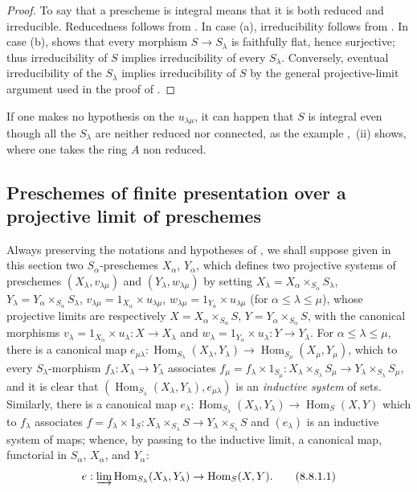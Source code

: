 \begin{proof}
To say that a prescheme is integral means that it is both reduced and irreducible. Reducedness follows from . In case (a), irreducibility follows from . In case (b),  shows that every morphism $S\to S_\lambda$ is faithfully flat, hence surjective; thus irreducibility of $S$ implies irreducibility of every $S_\lambda$. Conversely, eventual irreducibility of the $S_\lambda$ implies irreducibility of $S$ by the general projective-limit argument used in the proof of .
\end{proof}

\begin{remark}[8.7.4]
\label{IV.8.7.4}
If one makes no hypothesis on the $u_{\lambda\mu}$, it can happen that $S$ is integral even though all the $S_\lambda$ are neither reduced nor connected, as the example ,~(ii) shows, where one takes the ring $A$ non reduced.
\end{remark}

\subsection{Preschemes of finite presentation over a projective limit of preschemes}
\label{subsection:IV.8.8}

\begin{env}[8.8.1]
\label{IV.8.8.1}
Always preserving the notations and hypotheses of , we shall suppose given in this section two $S_\alpha$-preschemes $X_\alpha$, $Y_\alpha$, which defines  two projective systems of preschemes $(X_\lambda,v_{\lambda\mu})$ and $(Y_\lambda,w_{\lambda\mu})$ by setting $X_\lambda=X_\alpha\times_{S_\alpha}S_\lambda$, $Y_\lambda=Y_\alpha\times_{S_\alpha}S_\lambda$, $v_{\lambda\mu}=1_{X_\alpha}\times u_{\lambda\mu}$, $w_{\lambda\mu}=1_{Y_\alpha}\times u_{\lambda\mu}$ (for $\alpha\leqslant\lambda\leqslant\mu$), whose projective limits are respectively $X=X_\alpha\times_{S_\alpha}S$, $Y=Y_\alpha\times_{S_\alpha}S$, with the canonical morphisms $v_\lambda=1_{X_\alpha}\times u_\lambda:X\to X_\lambda$ and $w_\lambda=1_{Y_\alpha}\times u_\lambda:Y\to Y_\lambda$.
For $\alpha\leqslant\lambda\leqslant\mu$, there is a canonical map $e_{\mu\lambda}:\operatorname{Hom}_{S_\lambda}(X_\lambda,Y_\lambda)\to\operatorname{Hom}_{S_\mu}(X_\mu,Y_\mu)$, which to every $S_\lambda$-morphism $f_\lambda:X_\lambda\to Y_\lambda$ associates $f_\mu=f_\lambda\times 1_{S_\mu}:X_\lambda\times_{S_\lambda}S_\mu\to Y_\lambda\times_{S_\lambda}S_\mu$, and it is clear that $(\operatorname{Hom}_{S_\lambda}(X_\lambda,Y_\lambda),e_{\mu\lambda})$ is an \emph{inductive system} of sets.
Similarly, there is a canonical map $e_\lambda:\operatorname{Hom}_{S_\lambda}(X_\lambda,Y_\lambda)\to\operatorname{Hom}_S(X,Y)$ which to $f_\lambda$ associates $f=f_\lambda\times 1_S:X_\lambda\times_{S_\lambda}S\to Y_\lambda\times_{S_\lambda}S$ and $(e_\lambda)$ is an inductive system of maps; whence, by passing to the inductive limit, a canonical map, functorial in $S_\alpha$, $X_\alpha$, and $Y_\alpha$:
\[
  e:\varinjlim\operatorname{Hom}_{S_\lambda}(X_\lambda,Y_\lambda)\to\operatorname{Hom}_S(X,Y).
  \tag{8.8.1.1}\label{IV.8.8.1.1}
\]
\end{env}

